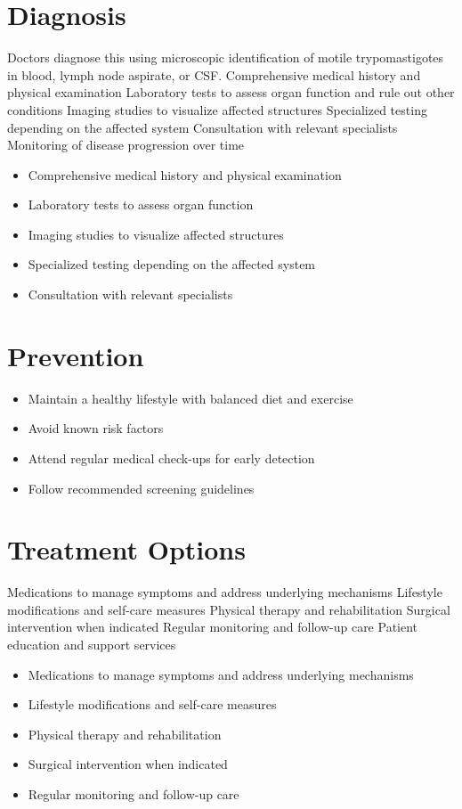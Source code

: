 \section{Diagnosis}
Doctors diagnose this using microscopic identification of motile trypomastigotes in blood, lymph node aspirate, or CSF. Comprehensive medical history and physical examination Laboratory tests to assess organ function and rule out other conditions Imaging studies to visualize affected structures Specialized testing depending on the affected system Consultation with relevant specialists Monitoring of disease progression over time

\begin{itemize}[noitemsep]
  \item Comprehensive medical history and physical examination
  \item Laboratory tests to assess organ function
  \item Imaging studies to visualize affected structures
  \item Specialized testing depending on the affected system
  \item Consultation with relevant specialists
\end{itemize}
\section{Prevention}
\begin{itemize}[noitemsep]
  \item Maintain a healthy lifestyle with balanced diet and exercise
  \item Avoid known risk factors
  \item Attend regular medical check-ups for early detection
  \item Follow recommended screening guidelines
\end{itemize}
\section{Treatment Options}
Medications to manage symptoms and address underlying mechanisms Lifestyle modifications and self-care measures Physical therapy and rehabilitation Surgical intervention when indicated Regular monitoring and follow-up care Patient education and support services

\begin{itemize}[noitemsep]
  \item Medications to manage symptoms and address underlying mechanisms
  \item Lifestyle modifications and self-care measures
  \item Physical therapy and rehabilitation
  \item Surgical intervention when indicated
  \item Regular monitoring and follow-up care
\end{itemize}
